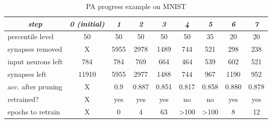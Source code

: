 \begin{table}[H]
\centering
\caption{PA progress example on MNIST}
\label{tab:pa_results_mnist}
\resizebox{\textwidth}{!} {
\begin{tabular}{|l|c|c|c|c|c|c|c|c|}
\hline
\multicolumn{1}{|c|}{\textit{step}} & \textit{0 (initial)} & \textit{1}                  & \textit{2}                  & \textit{3}                  & \textit{4}                 & \textit{5} & \textit{6} & \textit{7} \\ \hline
percentile level                    & 50                   & 50                          & 50                          & 50                          & 50                         & 35         & 20           & 20           \\ \hline
synapses removed                    & X                    & 5955                        & 2978                        & 1489                        & 744                        & 521            & 298            & 238           \\ \hline
input neurons left                  & 784                  & 784                         & 769                         & 664                         & 464                        & 539           & 602           & 521           \\ \hline
synapses left                       & 11910                & 5955                        & 2977                        & 1488                        & 744                        & 967           & 1190           & 952           \\ \hline
acc. after pruning                  & X                    & 0.9                         & 0.887                       & 0.851                       &  0.817                      & 0.858            & 0.880           & 0.878           \\ \hline
retrained?                          & X                    & \cellcolor[HTML]{34FF34}yes & \cellcolor[HTML]{34FF34}yes & \cellcolor[HTML]{34FF34}yes & \cellcolor[HTML]{FD6864}no & \cellcolor[HTML]{FD6864}no            & \cellcolor[HTML]{34FF34}yes            & \cellcolor[HTML]{34FF34}yes            \\ \hline
epochs to retrain                   & X                    & 0                           & 4                           & 63                          & \textgreater 100           & \textgreater 100           & 8           & 12           \\ \hline
\end{tabular}
}
\end{table}

